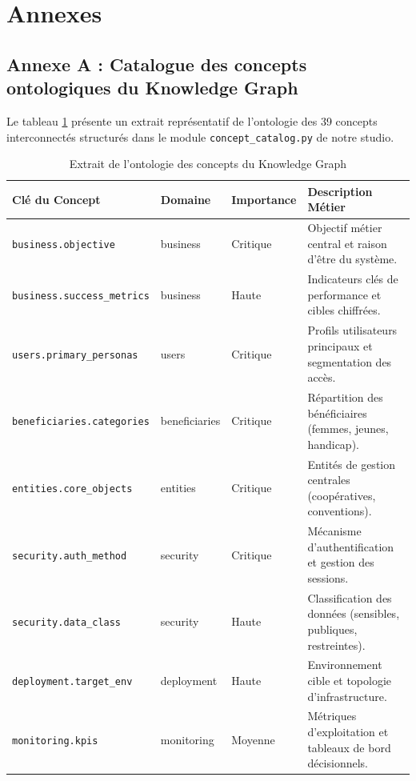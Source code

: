 \chapter*{Annexes}

\section*{Annexe A : Catalogue des concepts ontologiques du Knowledge Graph}

Le tableau \ref{tab:annexe_concepts} présente un extrait représentatif de l'ontologie des 39 concepts interconnectés structurés dans le module \texttt{concept\_catalog.py} de notre studio.

\begin{table}[H]
\centering
\caption{Extrait de l'ontologie des concepts du Knowledge Graph}
\label{tab:annexe_concepts}
\begin{tabularx}{\textwidth}{|l|l|l|X|}
\hline
\rowcolor{focpgreen!18}
\textbf{Clé du Concept} & \textbf{Domaine} & \textbf{Importance} & \textbf{Description Métier} \\
\hline
\texttt{business.objective} & business & Critique & Objectif métier central et raison d'être du système. \\
\hline
\texttt{business.success\_metrics} & business & Haute & Indicateurs clés de performance et cibles chiffrées. \\
\hline
\texttt{users.primary\_personas} & users & Critique & Profils utilisateurs principaux et segmentation des accès. \\
\hline
\texttt{beneficiaries.categories} & beneficiaries & Critique & Répartition des bénéficiaires (femmes, jeunes, handicap). \\
\hline
\texttt{entities.core\_objects} & entities & Critique & Entités de gestion centrales (coopératives, conventions). \\
\hline
\texttt{security.auth\_method} & security & Critique & Mécanisme d'authentification et gestion des sessions. \\
\hline
\texttt{security.data\_class} & security & Haute & Classification des données (sensibles, publiques, restreintes). \\
\hline
\texttt{deployment.target\_env} & deployment & Haute & Environnement cible et topologie d'infrastructure. \\
\hline
\texttt{monitoring.kpis} & monitoring & Moyenne & Métriques d'exploitation et tableaux de bord décisionnels. \\
\hline
\end{tabularx}
\end{table}

